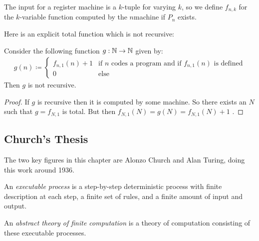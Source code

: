 \documentclass[10pt,a4paper]{article}
\begin{document}
The input for a register machine is a $k$-tuple for varying $k$, so we define $f_{n,k}$ for the $k$-variable function computed by the $n$\th machine if $P_n$ exists.

Here is an explicit total function which is not recursive:
\begin{lemma}
Consider the following function $g:\mathbb{N}\to\mathbb{N}$ given by:
\begin{align*}
g(n) \coloneqq \begin{cases} f_{n,1}(n) + 1 & \text{if $n$ codes a program and if $f_{n,1}(n)$ is defined} \\ 0 & \text{else}\end{cases}
\end{align*}
Then $g$ is not recursive.
\end{lemma}
\begin{proof}
If $g$ is recursive then it is computed by some machine. So there exists an $N$ such that $g = f_{N,1}$ is total. But then $f_{N,1}(N) = g(N) = f_{N,1}(N) + 1$ \contr.
\end{proof}

\subsection*{Church's Thesis}
The two key figures in this chapter are Alonzo Church and Alan Turing, doing this work around 1936.

An \emph{executable process} is a step-by-step deterministic process with finite description at each step, a finite set of rules, and a finite amount of input and output.

An \emph{abstract theory of finite computation} is a theory of computation consisting of these executable processes.
\end{document}
